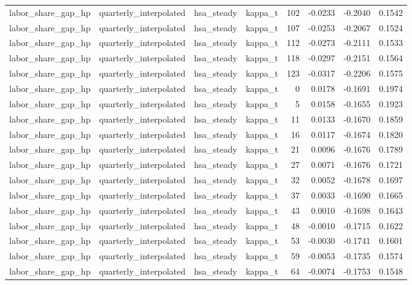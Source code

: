 \begin{tabular}{llllrrrr}
labor\_share\_gap\_hp & quarterly\_interpolated & hsa\_steady & kappa\_t & 102 & -0.0233 & -0.2040 & 0.1542 \\
labor\_share\_gap\_hp & quarterly\_interpolated & hsa\_steady & kappa\_t & 107 & -0.0253 & -0.2067 & 0.1524 \\
labor\_share\_gap\_hp & quarterly\_interpolated & hsa\_steady & kappa\_t & 112 & -0.0273 & -0.2111 & 0.1533 \\
labor\_share\_gap\_hp & quarterly\_interpolated & hsa\_steady & kappa\_t & 118 & -0.0297 & -0.2151 & 0.1564 \\
labor\_share\_gap\_hp & quarterly\_interpolated & hsa\_steady & kappa\_t & 123 & -0.0317 & -0.2206 & 0.1575 \\
labor\_share\_gap\_hp & quarterly\_interpolated & hsa\_steady & kappa\_t & 0 & 0.0178 & -0.1691 & 0.1974 \\
labor\_share\_gap\_hp & quarterly\_interpolated & hsa\_steady & kappa\_t & 5 & 0.0158 & -0.1655 & 0.1923 \\
labor\_share\_gap\_hp & quarterly\_interpolated & hsa\_steady & kappa\_t & 11 & 0.0133 & -0.1670 & 0.1859 \\
labor\_share\_gap\_hp & quarterly\_interpolated & hsa\_steady & kappa\_t & 16 & 0.0117 & -0.1674 & 0.1820 \\
labor\_share\_gap\_hp & quarterly\_interpolated & hsa\_steady & kappa\_t & 21 & 0.0096 & -0.1676 & 0.1789 \\
labor\_share\_gap\_hp & quarterly\_interpolated & hsa\_steady & kappa\_t & 27 & 0.0071 & -0.1676 & 0.1721 \\
labor\_share\_gap\_hp & quarterly\_interpolated & hsa\_steady & kappa\_t & 32 & 0.0052 & -0.1678 & 0.1697 \\
labor\_share\_gap\_hp & quarterly\_interpolated & hsa\_steady & kappa\_t & 37 & 0.0033 & -0.1690 & 0.1665 \\
labor\_share\_gap\_hp & quarterly\_interpolated & hsa\_steady & kappa\_t & 43 & 0.0010 & -0.1698 & 0.1643 \\
labor\_share\_gap\_hp & quarterly\_interpolated & hsa\_steady & kappa\_t & 48 & -0.0010 & -0.1715 & 0.1622 \\
labor\_share\_gap\_hp & quarterly\_interpolated & hsa\_steady & kappa\_t & 53 & -0.0030 & -0.1741 & 0.1601 \\
labor\_share\_gap\_hp & quarterly\_interpolated & hsa\_steady & kappa\_t & 59 & -0.0053 & -0.1735 & 0.1574 \\
labor\_share\_gap\_hp & quarterly\_interpolated & hsa\_steady & kappa\_t & 64 & -0.0074 & -0.1753 & 0.1548 \\

\end{tabular}
